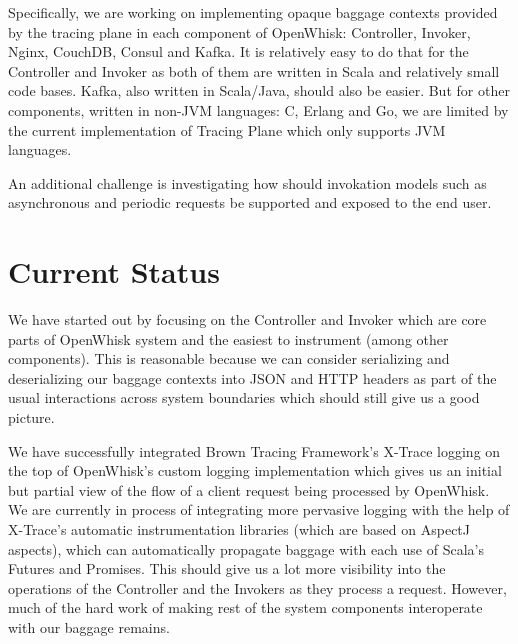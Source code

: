 Specifically, we are working on implementing opaque baggage contexts provided by the tracing plane in each component of OpenWhisk: Controller, Invoker, Nginx, CouchDB, Consul and Kafka. It is relatively easy to do that for the Controller and Invoker as both of them are written in Scala and relatively small code bases. Kafka, also written in Scala/Java, should also be easier. But for other components, written in non-JVM languages: C, Erlang and Go, we are limited by the current implementation of Tracing Plane which only supports JVM languages.

An additional challenge is investigating how should invokation models such as asynchronous and periodic requests be supported and exposed to the end user.

\section{Current Status}
We have started out by focusing on the Controller and Invoker which are core parts of OpenWhisk system and the easiest to instrument (among other components). This is reasonable because we can consider serializing and deserializing our baggage contexts into JSON and HTTP headers as part of the usual interactions across system boundaries which should still give us a good picture.

We have successfully integrated\cite[our implementation]{web:instru} Brown Tracing Framework's\cite{web:btf} X-Trace logging on the top of OpenWhisk's custom logging implementation which gives us an initial but partial view of the flow of a client request being processed by OpenWhisk. We are currently in process of integrating more pervasive logging with the help of X-Trace's automatic instrumentation libraries (which are based on AspectJ aspects), which can automatically propagate baggage with each use of Scala's Futures and Promises. This should give us a lot more visibility into the operations of the Controller and the Invokers as they process a request. However, much of the hard work of making rest of the system components interoperate with our baggage remains.
